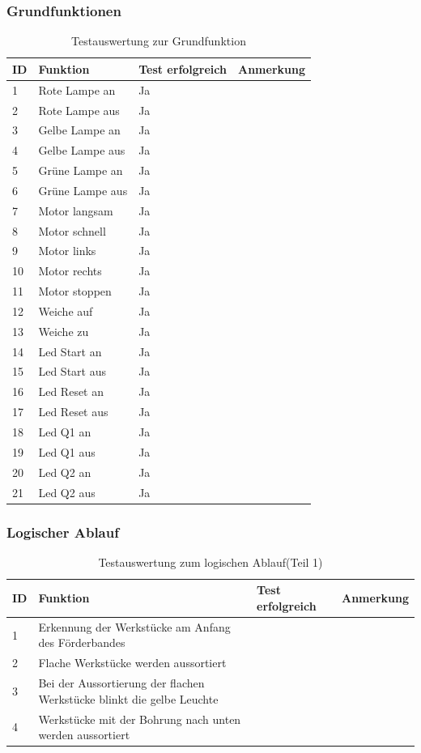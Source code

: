 \documentclass[a4paper, 11pt]{article}
\begin{document}
\subsubsection{Grundfunktionen}
\begin{table}[h]
\center
\begin{tabularx}{\textwidth}{|l|X|X|X|}
\hline
\textbf{ID}&\textbf{Funktion}&\textbf{Test erfolgreich}&\textbf{Anmerkung}\\
\hline
1&Rote Lampe an&Ja&\\
\hline
2&Rote Lampe aus&Ja&\\
\hline
3&Gelbe Lampe an&Ja&\\
\hline
4&Gelbe Lampe aus&Ja&\\
\hline
5&Grüne Lampe an&Ja&\\
\hline
6&Grüne Lampe aus&Ja&\\
\hline
7&Motor langsam&Ja&\\
\hline
8&Motor schnell&Ja&\\
\hline
9&Motor links&Ja&\\
\hline
10&Motor rechts&Ja&\\
\hline
11&Motor stoppen&Ja&\\
\hline
12&Weiche auf&Ja&\\
\hline
13&Weiche zu&Ja&\\
\hline
14&Led Start an&Ja&\\
\hline
15&Led Start aus&Ja&\\
\hline
16&Led Reset an&Ja&\\
\hline
17&Led Reset aus&Ja&\\
\hline
18&Led Q1 an&Ja&\\
\hline
19&Led Q1 aus&Ja&\\
\hline
20&Led Q2 an&Ja&\\
\hline
21&Led Q2 aus&Ja&\\
\hline
\end{tabularx}
\caption{Testauswertung zur Grundfunktion}
\label{tstg1}
\end{table}

\subsubsection{Logischer Ablauf} 
\begin{table}[h]
\center
\begin{tabularx}{\textwidth}{|l|X|X|X|}
\hline
\textbf{ID}&\textbf{Funktion}&\textbf{Test erfolgreich}&\textbf{Anmerkung}\\
\hline
1&Erkennung der Werkstücke am Anfang des Förderbandes&&\\
\hline
2&Flache Werkstücke werden aussortiert&&\\
\hline
3&Bei der Aussortierung der flachen Werkstücke blinkt die gelbe Leuchte&&\\
\hline
4&Werkstücke mit der Bohrung nach unten werden aussortiert&&\\
\hline
\end{tabularx}
\caption{Testauswertung zum logischen Ablauf(Teil 1)}
\label{tstl1}
\end{table}
\end{document}
